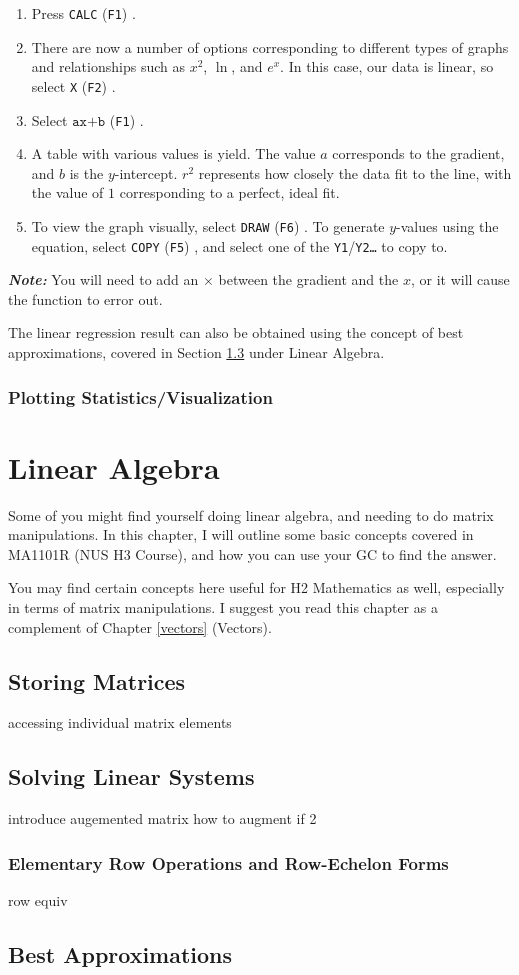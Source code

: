 \documentclass[a5paper,draft]{memoir}
\def\code#1{\texttt{#1}}
\def\note#1{\textbf{\textit{Note:}} #1}
\def\Fone{(\code{F1}) }
\def\Ftwo{(\code{F2}) }
\def\Ffive{(\code{F5}) }
\def\Fsix{(\code{F6}) }
\begin{document}
\begin{enumerate}
	\item Press \code{CALC} \Fone.
	\item There are now a number of options corresponding to different types of graphs and relationships such as $x^2$, $\ln$, and $e^x$. In this case, our data is linear, so select \code{X} \Ftwo.
	\item Select $\code{ax+b}$ \Fone.
	\item A table with various values is yield. The value $a$ corresponds to the gradient, and $b$ is the $y$-intercept. $r^2$ represents how closely the data fit to the line, with the value of $1$ corresponding to a perfect, ideal fit.
	\item To view the graph visually, select \code{DRAW} \Fsix. To generate $y$-values using the equation, select \code{COPY} \Ffive, and select one of the \code{Y1}/\code{Y2\dots} to copy to.
\end{enumerate}

\note{You will need to add an $\times$ between the gradient and the $x$, or it will cause the function to error out.}

The linear regression result can also be obtained using the concept of best approximations, covered in Section \ref{bestapprox} under Linear Algebra.

\subsection{Plotting Statistics/Visualization} \label{plotstat}


\chapter{Linear Algebra} \label{chap:linalge}
Some of you might find yourself doing linear algebra, and needing to do matrix manipulations. In this chapter, I will outline some basic concepts covered in MA1101R (NUS H3 Course), and how you can use your GC to find the answer.

You may find certain concepts here useful for H2 Mathematics as well, especially in terms of matrix manipulations. I suggest you read this chapter as a complement of Chapter \ref{vectors} (Vectors). 

\section{Storing Matrices}
accessing individual matrix elements

\section{Solving Linear Systems} \label{solvLinSys}
introduce augemented matrix
how to augment if 2

\subsection{Elementary Row Operations and Row-Echelon Forms}
row equiv

\section{Best Approximations} \label{bestapprox}

\printindex
\end{document}
